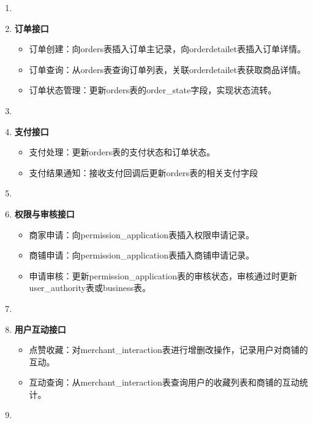 \begin{enumerate}
    \item[]

    \item \textbf{订单接口}
          \begin{itemize}
              \item 订单创建：向orders表插入订单主记录，向orderdetailet表插入订单详情。
              \item 订单查询：从orders表查询订单列表，关联orderdetailet表获取商品详情。
              \item 订单状态管理：更新orders表的order\_state字段，实现状态流转。
          \end{itemize}

    \item[]

    \item \textbf{支付接口}
          \begin{itemize}
              \item 支付处理：更新orders表的支付状态和订单状态。
              \item 支付结果通知：接收支付回调后更新orders表的相关支付字段
          \end{itemize}

    \item[]

    \item \textbf{权限与审核接口}
          \begin{itemize}
              \item 商家申请：向permission\_application表插入权限申请记录。
              \item 商铺申请：向permission\_application表插入商铺申请记录。
              \item 申请审核：更新permission\_application表的审核状态，审核通过时更新user\_authority表或business表。
          \end{itemize}

    \item[]

    \item \textbf{用户互动接口}
          \begin{itemize}
              \item 点赞收藏：对merchant\_interaction表进行增删改操作，记录用户对商铺的互动。
              \item 互动查询：从merchant\_interaction表查询用户的收藏列表和商铺的互动统计。
          \end{itemize}

    \item[]


\end{enumerate}
